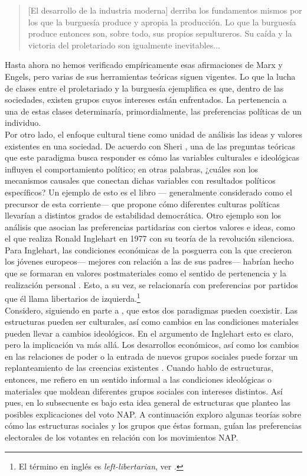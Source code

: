 \begin{quote}
[El desarrollo de la industria moderna] derriba los fundamentos mismos por los que la burguesía produce y apropia la producción. Lo que la burguesía produce entonces son, sobre todo, sus propios sepultureros. Su caída y la victoria del proletariado son igualmente inevitables...
\end{quote}

Hasta ahora no hemos verificado empíricamente esas afirmaciones de Marx y Engels, pero varias de sus herramientas teóricas siguen vigentes. Lo que la lucha de clases entre el proletariado y la burguesía ejemplifica es que, dentro de las sociedades, existen grupos cuyos intereses están enfrentados. La pertenencia a una de estas clases determinaría, primordialmente, las preferencias políticas de un individuo.\\

Por otro lado, el enfoque cultural tiene como unidad de análisis las ideas y valores existentes en una sociedad. 
De acuerdo con Sheri \textcite{Berman01}, una de las preguntas teóricas que este paradigma busca responder es cómo las variables culturales e ideológicas influyen el comportamiento político; en otras palabras, ¿cuáles son los mecanismos causales que conectan dichas variables con resultados políticos específicos? Un ejemplo de esto es el libro  \parencite{AlmondVerba63}--- generalmente considerado como el precursor de esta corriente--- que propone cómo diferentes culturas políticas llevarían a distintos grados de estabilidad democrática. Otro ejemplo son los análisis que asocian las preferencias partidarias con ciertos valores e ideas, como el que realiza Ronald Inglehart en 1977 con su teoría de la revolución silenciosa. Para Inglehart, las condiciones económicas de la posguerra con la que crecieron los jóvenes europeos--- mejores con relación a las de sus padres--- habrían hecho que se formaran en valores postmateriales como el sentido de pertenencia y la realización personal \parencite{Kesselman79}. Esto, a su vez, se relacionaría con preferencias por partidos que él llama libertarios de izquierda.\footnote{El término en inglés es \textit{left-libertarian}, ver \textcite{Inglehart16}.}\\ 

Considero, siguiendo en parte a \textcite{Sewell92}, que estos dos paradigmas pueden coexistir. Las estructuras pueden ser culturales, así como cambios en las condiciones materiales pueden llevar a cambios ideológicos. En el argumento de Inglehart esto es claro, pero la implicación va más allá. Los desarrollos económicos, así como los cambios en las relaciones de poder o la entrada de nuevos grupos sociales puede forzar un replanteamiento de las creencias existentes \parencite[235]{Berman01}. Cuando hablo de estructuras, entonces, me refiero en un sentido informal a las condiciones ideológicas o materiales que moldean diferentes grupos sociales con intereses distintos. Así pues, en lo subsecuente es bajo esta idea general de estructuras que planteo las posibles explicaciones del voto NAP. A continuación exploro algunas teorías sobre cómo las estructuras sociales y los grupos que éstas forman, guían las preferencias electorales de los votantes en relación con los movimientos NAP.

